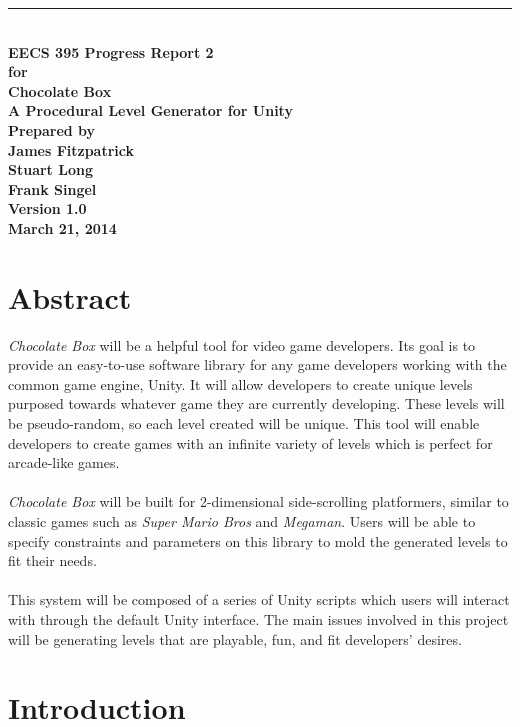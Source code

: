 \documentclass[pdftex,12pt,letter]{article}
\newcommand{\HRule}{\rule{\linewidth}{0.5mm}}
\begin{document}
\begin{titlepage}
\begin{flushright}
\HRule \\[0.4cm]
{ \bfseries
{\huge EECS 395 Progress Report 2\\[1cm]}
{\Large for\\[1cm]}
{\huge Chocolate Box\large\\[.1cm]
A Procedural Level Generator for Unity\\[3cm]}
{\large Prepared by\\[1cm]James Fitzpatrick\\Stuart Long\\Frank Singel\\[2cm]
Version 1.0\\
March 21, 2014\\
}}
\end{flushright}
\end{titlepage}
\FloatBarrier
\newpage
\tableofcontents
\newpage
\section{Abstract}
\textit{Chocolate Box} will be a helpful tool for video game developers. Its goal is to provide an easy-to-use software library for any game developers working with the common game engine, Unity. It will allow developers to create unique levels purposed towards whatever game they are currently developing. These levels will be pseudo-random, so each level created will be unique. This tool will enable developers to create games with an infinite variety of levels which is perfect for arcade-like games. 
\\\\
\textit{Chocolate Box} will be built for 2-dimensional side-scrolling platformers, similar to classic games such as \textit{Super Mario Bros} and \textit{Megaman}. Users will be able to specify constraints and parameters on this library to mold the generated levels to fit their needs. 
\\\\
This system will be composed of a series of Unity scripts which users will interact with through the default Unity interface. The main issues involved in this project will be generating levels that are playable, fun, and fit developers' desires.
\newpage

\section{Introduction}
\end{document}
